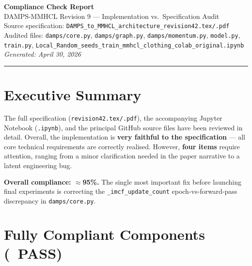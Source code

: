 \documentclass[12pt,a4paper]{article}
\newcommand{\PASS}{\textcolor{passgreen}{\ding{51}~\textbf{PASS}}}
\begin{document}

\begin{center}
  {\LARGE\bfseries Compliance Check Report}\\[0.5em]
  {\large DAMPS-MMHCL Revision 9 --- Implementation vs.\ Specification Audit}\\[0.3em]
  {\normalsize Source specification: \texttt{DAMPS\_to\_MMHCL\_architecture\_revision42.tex/.pdf}}\\[0.2em]
  {\normalsize Audited files: \texttt{damps/core.py}, \texttt{damps/graph.py},
   \texttt{damps/momentum.py}, \texttt{model.py}, \texttt{train.py},
   \texttt{Local\_Random\_seeds\_train\_mmhcl\_clothing\_colab\_original.ipynb}}\\[0.4em]
  \textit{Generated: April 30, 2026}
\end{center}

\vspace{1em}
\hrule
\vspace{1em}

\section*{Executive Summary}

The full specification (\texttt{revision42.tex/.pdf}), the accompanying Jupyter
Notebook (\texttt{.ipynb}), and the principal GitHub source files have been
reviewed in detail.  Overall, the implementation is \textbf{very faithful to the
specification} --- all core technical requirements are correctly realised.
However, \textbf{four items} require attention, ranging from a minor
clarification needed in the paper narrative to a latent engineering bug.

\vspace{0.5em}
\noindent\textbf{Overall compliance: $\approx$95\%.}  The single most important
fix before launching final experiments is correcting the
\texttt{\_imcf\_update\_count} epoch-vs-forward-pass discrepancy in
\texttt{damps/core.py}.

\section{Fully Compliant Components (\PASS)}
\end{document}
